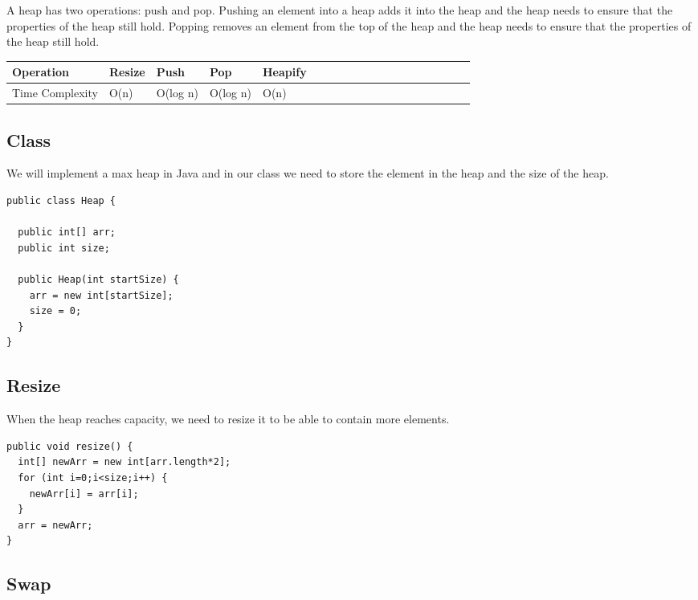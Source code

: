 \documentclass[11pt,oneside]{book}
\begin{document}
A heap has two operations: push and pop. Pushing an element into a heap adds it into the heap and the heap needs to ensure that the properties of the heap still hold. Popping removes an element from the top of the heap and the heap needs to ensure that the properties of the heap still hold.

\begin{center}\begin{tabulary}{0.4\linewidth}{|l|l|l|l|l|l|l|l|l|l|l|l|l|l|l|l|l|l|l}\hline


  Operation &
  Resize &
  Push &
  Pop &
  Heapify\\
\hline


  Time Complexity &
  O(n) &
  O(log n) &
  O(log n) &
  O(n)\\

\hline\end{tabulary}\end{center}

\subsection{Class}

We will implement a max heap in Java and in our class we need to store the element in the heap and the size of the heap.

\begin{lstlisting}
public class Heap {

  public int[] arr;
  public int size;

  public Heap(int startSize) {
    arr = new int[startSize];
    size = 0;
  }
}
\end{lstlisting}

\subsection{Resize}

When the heap reaches capacity, we need to resize it to be able to contain more elements.

\begin{lstlisting}
public void resize() {
  int[] newArr = new int[arr.length*2];
  for (int i=0;i<size;i++) {
    newArr[i] = arr[i];
  }
  arr = newArr;
}
\end{lstlisting}

\subsection{Swap}
\end{document}
